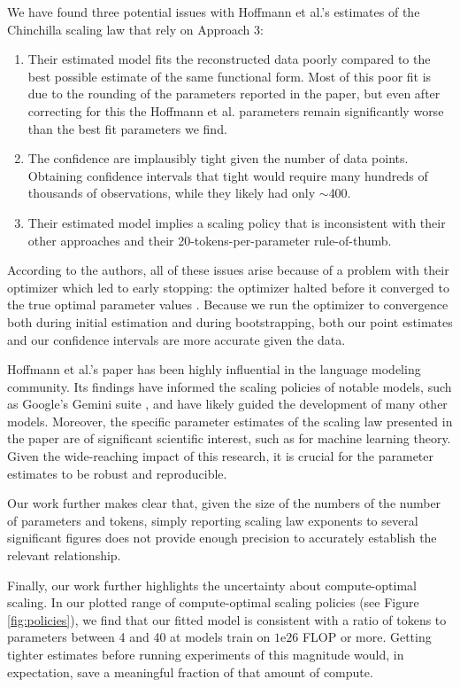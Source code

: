 \documentclass[twocolumn]{article}
\begin{document}
We have found three potential issues with Hoffmann et al.'s estimates of the Chinchilla scaling law that rely on Approach 3:
\begin{enumerate}
    \item Their estimated model fits the reconstructed data poorly compared to the best possible estimate of the same functional form. Most of this poor fit is due to the rounding of the parameters reported in the paper, but even after correcting for this the Hoffmann et al. parameters remain significantly worse than the best fit parameters we find.
    \item The confidence are implausibly tight given the number of data points. Obtaining confidence intervals that tight would require many hundreds of thousands of observations, while they likely had only $\sim$400.
    \item Their estimated model implies a scaling policy that is inconsistent with their other approaches and their 20-tokens-per-parameter rule-of-thumb.
\end{enumerate}

According to the authors, all of these issues arise because of a problem with their optimizer which led to early stopping: the optimizer halted before it converged to the true optimal parameter values \cite{borgeaud2024great}. Because we run the optimizer to convergence both during initial estimation and during bootstrapping, both our point estimates and our confidence intervals are more accurate given the data.

Hoffmann et al.'s paper has been highly influential in the language modeling community. Its findings have informed the scaling policies of notable models, such as Google's Gemini suite \citep{team2023gemini}, and have likely guided the development of many other models. Moreover, the specific parameter estimates of the scaling law presented in the paper are of significant scientific interest, such as for machine learning theory. Given the wide-reaching impact of this research, it is crucial for the parameter estimates to be robust and reproducible.

Our work further makes clear that, given the size of the numbers of the number of parameters and tokens, simply reporting scaling law exponents to several significant figures does not provide enough precision to accurately establish the relevant relationship.

Finally, our work further highlights the uncertainty about compute-optimal scaling. In our plotted range of compute-optimal scaling policies (see Figure \ref{fig:policies}), we find that our fitted model is consistent with a ratio of tokens to parameters between 4 and 40 at models train on $1\mathrm{e}26$ FLOP or more. Getting tighter estimates before running experiments of this magnitude would, in expectation, save a meaningful fraction of that amount of compute. 
\end{document}
